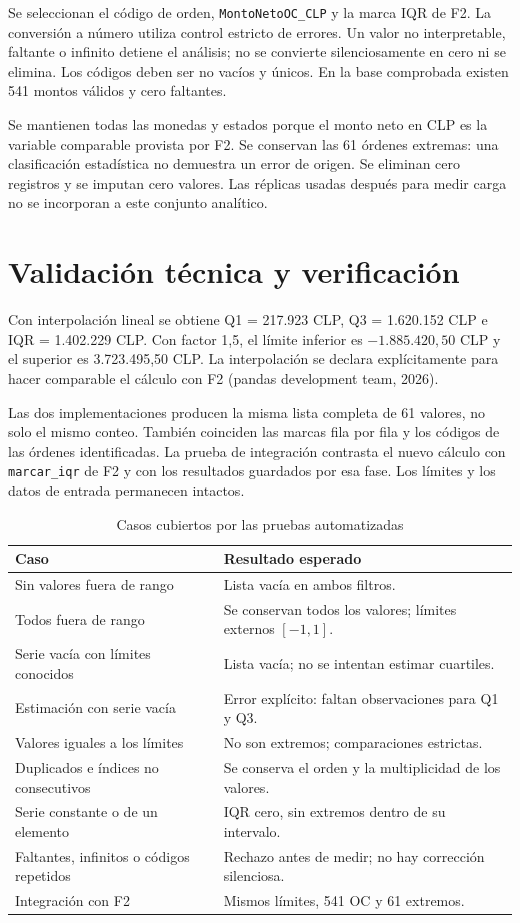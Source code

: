 \documentclass[11pt,letterpaper]{article}
\begin{document}
Se seleccionan el código de orden, \texttt{MontoNetoOC\_CLP} y la marca IQR de F2. La conversión
a número utiliza control estricto de errores. Un valor no interpretable, faltante o infinito
detiene el análisis; no se convierte silenciosamente en cero ni se elimina. Los códigos deben
ser no vacíos y únicos. En la base comprobada existen 541 montos válidos y cero faltantes.

Se mantienen todas las monedas y estados porque el monto neto en CLP es la variable comparable
provista por F2. Se conservan las 61 órdenes extremas: una clasificación estadística no
demuestra un error de origen. Se eliminan cero registros y se imputan cero valores. Las
réplicas usadas después para medir carga no se incorporan a este conjunto analítico.

\section{Validación técnica y verificación}
Con interpolación lineal se obtiene Q1 = 217.923 CLP, Q3 = 1.620.152 CLP e IQR = 1.402.229 CLP.
Con factor 1,5, el límite inferior es $-1.885.420,50$ CLP y el superior es 3.723.495,50 CLP.
La interpolación se declara explícitamente para hacer comparable el cálculo con F2
(pandas development team, 2026).

Las dos implementaciones producen la misma lista completa de 61 valores, no solo el mismo
conteo. También coinciden las marcas fila por fila y los códigos de las órdenes identificadas.
La prueba de integración contrasta el nuevo cálculo con \texttt{marcar\_iqr} de F2 y con
los resultados guardados por esa fase. Los límites y los datos de entrada permanecen intactos.

\begin{table}[H]\centering
\caption{Casos cubiertos por las pruebas automatizadas}
\begin{tabularx}{\textwidth}{@{}>{\raggedright\arraybackslash}p{4.3cm}X@{}}\toprule
Caso & Resultado esperado \\ \midrule
Sin valores fuera de rango & Lista vacía en ambos filtros. \\
Todos fuera de rango & Se conservan todos los valores; límites externos $[-1,1]$. \\
Serie vacía con límites conocidos & Lista vacía; no se intentan estimar cuartiles. \\
Estimación con serie vacía & Error explícito: faltan observaciones para Q1 y Q3. \\
Valores iguales a los límites & No son extremos; comparaciones estrictas. \\
Duplicados e índices no consecutivos & Se conserva el orden y la multiplicidad de los valores. \\
Serie constante o de un elemento & IQR cero, sin extremos dentro de su intervalo. \\
Faltantes, infinitos o códigos repetidos & Rechazo antes de medir; no hay corrección silenciosa. \\
Integración con F2 & Mismos límites, 541 OC y 61 extremos. \\
\bottomrule\end{tabularx}
\end{table}
\end{document}
